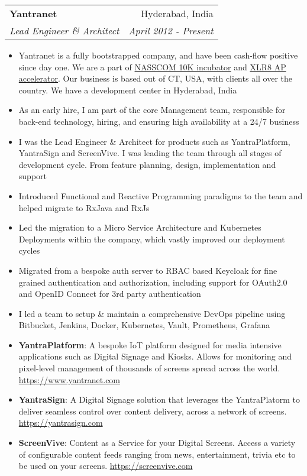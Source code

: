 \documentclass[letterpaper,11pt]{article}
\makeatletter
\newcommand{\resumeItem}[2]{
  \item\small{
    \textbf{#1}{: #2 \vspace{-2pt}}
  }
}
\newcommand{\resumeSubheading}[4]{
  \vspace{-1pt}\item
    \begin{tabular*}{0.97\textwidth}[t]{l@{\extracolsep{\fill}}r}
      \textbf{#1} & #2 \\
      \textit{\small#3} & \textit{\small #4} \\
    \end{tabular*}\vspace{-5pt}
}
\newcommand{\resumeItemListStart}{\begin{itemize}}
\newcommand{\resumeItemListEnd}{\end{itemize}\vspace{-5pt}}
\makeatother
\begin{document}
    \resumeSubheading
      {Yantranet}{Hyderabad, India}
      {Lead Engineer \& Architect}{April 2012 - Present}
      \resumeItemListStart
        \item{Yantranet is a fully bootstrapped company, and have been cash-flow positive since day one. We are a part of \href{http://10000startups.com/our-startups}{NASSCOM 10K incubator} and \href{http://xlr8ap.com}{XLR8 AP accelerator}. Our business is based out of CT, USA, with clients all over the country. We have a development center in Hyderabad, India}
        \item{As an early hire, I am part of the core Management team, responsible for back-end technology, hiring, and ensuring high availability at a 24/7 business}
        \item{I was the Lead Engineer \& Architect for products such as YantraPlatform, YantraSign and ScreenVive. I was leading the team through all stages of development cycle. From feature planning, design, implementation and support}
        \item{Introduced Functional and Reactive Programming paradigms to the team and helped migrate to RxJava and RxJs}
        \item{Led the migration to a Micro Service Architecture and Kubernetes Deployments within the company, which vastly improved our deployment cycles}
        \item{Migrated from a bespoke auth server to RBAC based Keycloak for fine grained authentication and authorization, including support for OAuth2.0 and OpenID Connect for 3rd party authentication}
        \item{I led a team to setup \& maintain a comprehensive DevOps pipeline using Bitbucket, Jenkins, Docker, Kubernetes, Vault, Prometheus, Grafana}
        \resumeItem{YantraPlatform} 
          {A bespoke IoT platform designed for media intensive applications such as Digital Signage and Kiosks. Allows for monitoring and pixel-level management of thousands of screens spread across the world. \href{https://www.yantranet.com}{https://www.yantranet.com}}
        \resumeItem{YantraSign}
          {A Digital Signage solution that leverages the YantraPlatorm to deliver seamless control over content delivery, across a network of screens. \href{https://yantrasign.com}{https://yantrasign.com}}
        \resumeItem{ScreenVive} 
          {Content as a Service for your Digital Screens. Access a variety of configurable content feeds ranging from  news, entertainment, trivia etc to be used on your screens. \href{https://screenvive.com}{https://screenvive.com}}
      \resumeItemListEnd
  
\end{document}
